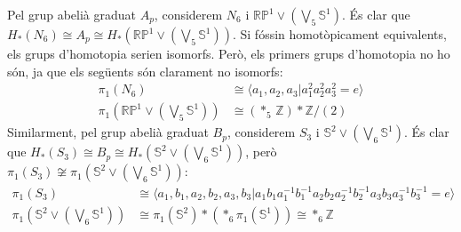 \documentclass[compress,10pt]{article}
\theoremstyle{definition}
\begin{document}
Pel grup abelià graduat $A_{p}$, considerem $N_{6}$ i $\mathbb{RP}^{1}\vee(\bigvee_{5}\mathbb{S}^{1})$. És clar que $H_{*}(N_{6})\cong A_{p}\cong H_{*}(\mathbb{RP}^{1}\vee(\bigvee_{5}\mathbb{S}^{1}))$. Si fóssin homotòpicament equivalents, els grups d'homotopia serien isomorfs. Però, els primers grups d'homotopia no ho són, ja que els següents són clarament no isomorfs:
\begin{align*}
    \pi_{1}(N_{6})
    &\cong\langle a_{1},a_{2},a_{3}|a_{1}^{2}a_{2}^{2}a_{3}^{2}=e\rangle\\
    \pi_{1}(\mathbb{RP}^{1}\vee(\bigvee_{5}\mathbb{S}^{1}))
    &\cong(*_{5}\,\mathbb{Z})*\mathbb{Z}/(2)
\end{align*}
Similarment, pel grup abelià graduat $B_{p}$, considerem $S_{3}$ i $\mathbb{S}^{2}\vee(\bigvee_{6}\mathbb{S}^{1})$. És clar que $H_{*}(S_{3})\cong B_{p}\cong H_{*}(\mathbb{S}^{2}\vee(\bigvee_{6}\mathbb{S}^{1}))$, però $\pi_{1}(S_{3})\not\cong\pi_{1}(\mathbb{S}^{2}\vee(\bigvee_{6}\mathbb{S}^{1}))$:
\begin{align*}
    \pi_{1}(S_{3})
    &\cong\langle a_{1},b_{1},a_{2},b_{2},a_{3},b_{3}|a_{1}b_{1}a_{1}^{-1}b_{1}^{-1}a_{2}b_{2}a_{2}^{-1}b_{2}^{-1}a_{3}b_{3}a_{3}^{-1}b_{3}^{-1}=e\rangle\\
    \pi_{1}(\mathbb{S}^{2}\vee(\bigvee_{6}\mathbb{S}^{1}))
    &\cong\pi_{1}(\mathbb{S}^{2})*(*_{6}\pi_{1}(\mathbb{S}^{1}))
    \cong*_{6}\mathbb{Z}
\end{align*}
\end{document}
